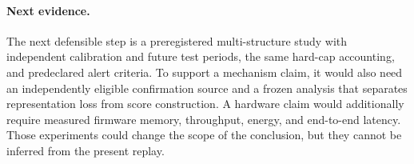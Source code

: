 \paragraph{Next evidence.}
The next defensible step is a preregistered multi-structure study with
independent calibration and future test periods, the same hard-cap accounting,
and predeclared alert criteria. To support a mechanism claim, it would also
need an independently eligible confirmation source and a frozen analysis that
separates representation loss from score construction. A hardware claim would
additionally require measured firmware memory, throughput, energy, and
end-to-end latency. Those experiments could change the scope of the
conclusion, but they cannot be inferred from the present replay.
